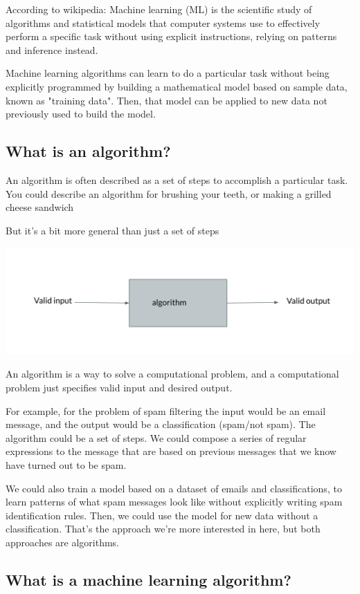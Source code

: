 \documentclass[12pt]{article}
\begin{document}
According to wikipedia:
Machine learning (ML) is the scientific study of algorithms and statistical models that computer systems use to 
effectively perform a specific task without using explicit instructions, relying on patterns and inference instead.


Machine learning algorithms can learn to do a particular task without being explicitly programmed by building a 
mathematical model based on sample data, known as "training data". Then, that model can be applied to new data 
not previously used to build the model. 

\subsection{What is an algorithm?}

An algorithm is often described as a set of steps to accomplish a particular task. You could describe an algorithm for brushing your teeth, or making a grilled cheese sandwich 

But it's a bit more general than just a set of steps 

\includegraphics[width={\textwidth}]{algo-abstract}


An algorithm is a way to solve a computational problem, and a computational problem just specifies valid input and desired output. 

For example, for the problem of spam filtering the input would be an email message, and the output would be a 
classification (spam/not spam). The algorithm could be a set of steps. We could compose a series of regular expressions to 
the message that are based on previous messages that we know have turned out to be spam. 

We could also train a model based on a dataset of emails and classifications, to learn patterns of what spam messages 
look like without explicitly writing spam identification rules. Then, we could use the model for new data without a 
classification. That's the approach we're more interested in here, but both approaches are algorithms.

\subsection{What is a machine learning algorithm?}
\end{document}
